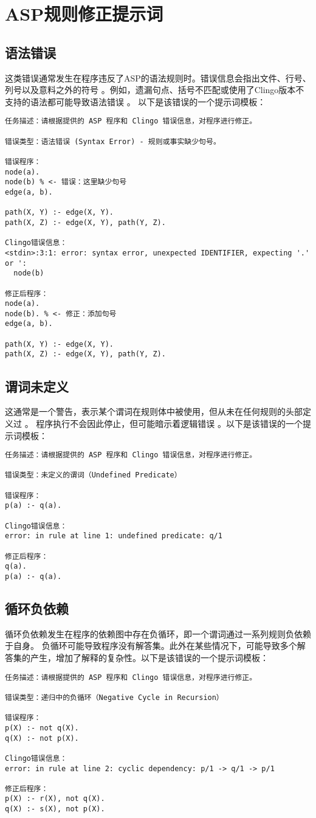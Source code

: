\section{ASP规则修正提示词}
\label{appendix:rule-fix}
\subsection{语法错误}
这类错误通常发生在程序违反了ASP的语法规则时。错误信息会指出文件、行号、列号以及意料之外的符号 。例如，遗漏句点、括号不匹配或使用了Clingo版本不支持的语法都可能导致语法错误 。
以下是该错误的一个提示词模板：
\begin{lstlisting}
任务描述：请根据提供的 ASP 程序和 Clingo 错误信息，对程序进行修正。

错误类型：语法错误 (Syntax Error) - 规则或事实缺少句号。

错误程序：
node(a).
node(b) % <- 错误：这里缺少句号
edge(a, b).

path(X, Y) :- edge(X, Y).
path(X, Z) :- edge(X, Y), path(Y, Z).

Clingo错误信息：
<stdin>:3:1: error: syntax error, unexpected IDENTIFIER, expecting '.' or ':
  node(b)

修正后程序：
node(a).
node(b). % <- 修正：添加句号
edge(a, b).

path(X, Y) :- edge(X, Y).
path(X, Z) :- edge(X, Y), path(Y, Z).
\end{lstlisting}
\subsection{谓词未定义}
这通常是一个警告，表示某个谓词在规则体中被使用，但从未在任何规则的头部定义过 。
程序执行不会因此停止，但可能暗示着逻辑错误 。以下是该错误的一个提示词模板：
\begin{lstlisting}
任务描述：请根据提供的 ASP 程序和 Clingo 错误信息，对程序进行修正。

错误类型：未定义的谓词（Undefined Predicate）

错误程序：
p(a) :- q(a).

Clingo错误信息：
error: in rule at line 1: undefined predicate: q/1

修正后程序：
q(a).
p(a) :- q(a).
\end{lstlisting}
\subsection{循环负依赖}
循环负依赖发生在程序的依赖图中存在负循环，即一个谓词通过一系列规则负依赖于自身。
负循环可能导致程序没有解答集。​此外在某些情况下，可能导致多个解答集的产生，增加了解释的复杂性。以下是该错误的一个提示词模板：
\begin{lstlisting}
任务描述：请根据提供的 ASP 程序和 Clingo 错误信息，对程序进行修正。

错误类型：​递归中的负循环（Negative Cycle in Recursion）​

错误程序：
p(X) :- not q(X).
q(X) :- not p(X).

Clingo错误信息：
error: in rule at line 2: cyclic dependency: p/1 -> q/1 -> p/1

修正后程序：
p(X) :- r(X), not q(X).
q(X) :- s(X), not p(X).
\end{lstlisting}
